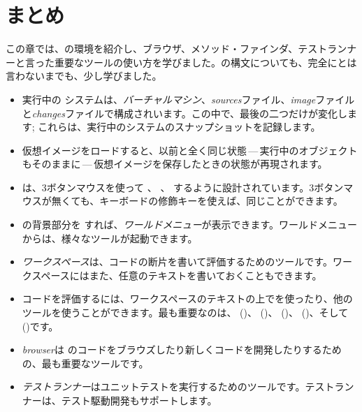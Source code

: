 \documentclass[a4paper,10pt,twoside]{book}
\begin{document}
\section{まとめ}
この章では、\pharo の環境を紹介し、ブラウザ、メソッド・ファインダ、テストランナーと言った重要なツールの使い方を学びました。\pharo の構文についても、完全にとは言わないまでも、少し学びました。

\begin{itemize}
  \item 実行中の \pharo システムは、\emph{バーチャルマシン}、\emph{sources}ファイル、\emph{image}ファイルと\emph{changes}ファイルで構成されいます。この中で、最後の二つだけが変化します; これらは、実行中のシステムのスナップショットを記録します。
  \item \pharo 仮想イメージをロードすると、以前と全く同じ状態\,---\,実行中のオブジェクトもそのままに\,---\,仮想イメージを保存したときの状態が再現されます。
  \item \pharo は、3ボタンマウスを使って \click、 \actclick、 \metaclick するように設計されています。3ボタンマウスが無くても、キーボードの修飾キーを使えば、同じことができます。
  \item \pharo の背景部分を \click すれば、\emph{ワールドメニュー}が表示できます。ワールドメニューからは、様々なツールが起動できます。
  \item \emph{ワークスペース}は、コードの断片を書いて評価するためのツールです。ワークスペースにはまた、任意のテキストを書いておくこともできます。
  \item コードを評価するには、ワークスペースのテキストの上でを使ったり、他のツールを使うことができます。最も重要なのは、 ()、 ()、 ()、 ()、そして ()です。
  \item \emph{browser}は \pharo のコードをブラウズしたり新しくコードを開発したりするための、最も重要なツールです。
  \item \emph{テストランナー}はユニットテストを実行するためのツールです。テストランナーは、テスト駆動開発もサポートします。
\end{itemize}

\ifx\wholebook\relax\else 
   
   
\end{document}
